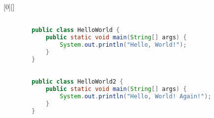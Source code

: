 
\usepackage{listings}



[0][]{

    \begin{lstlisting}[language=Java, label=lst:javaCode1_tmpname]

        public class HelloWorld {
            public static void main(String[] args) {
                System.out.println("Hello, World!");
            }
        }

    \end{lstlisting}

}

{
    \begin{lstlisting}[language=Java, label=lst:javaCode2_tmpname]

        public class HelloWorld2 {
            public static void main(String[] args) {
                System.out.println("Hello, World! Again!");
            }
        }

    \end{lstlisting}
}
